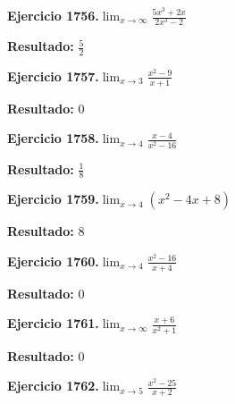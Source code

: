 \documentclass[10pt,a4paper]{article}
\begin{document}
\newpage
\begin{ejbox}
\textbf{Ejercicio 1756.}\quad $\lim_{x\to \infty} \frac{5x^3 + 2x}{2x^3 - 2}$
\end{ejbox}

\begin{solbox}
\textbf{Resultado:} \(\displaystyle \frac{5}{2}\)
\end{solbox}

\begin{ejbox}
\textbf{Ejercicio 1757.}\quad $\lim_{x\to 3} \frac{x^2-9}{x+1}$
\end{ejbox}

\begin{solbox}
\textbf{Resultado:} \(\displaystyle 0\)
\end{solbox}

\begin{ejbox}
\textbf{Ejercicio 1758.}\quad $\lim_{x\to 4} \frac{x-4}{x^2-16}$
\end{ejbox}

\begin{solbox}
\textbf{Resultado:} \(\displaystyle \frac{1}{8}\)
\end{solbox}

\newpage
\begin{ejbox}
\textbf{Ejercicio 1759.}\quad $\lim_{x\to 4} (x^2 -4x +8)$
\end{ejbox}

\begin{solbox}
\textbf{Resultado:} \(\displaystyle 8\)
\end{solbox}

\begin{ejbox}
\textbf{Ejercicio 1760.}\quad $\lim_{x\to 4} \frac{x^2-16}{x+4}$
\end{ejbox}

\begin{solbox}
\textbf{Resultado:} \(\displaystyle 0\)
\end{solbox}

\begin{ejbox}
\textbf{Ejercicio 1761.}\quad $\lim_{x\to \infty} \frac{x + 6}{x^2 + 1}$
\end{ejbox}

\begin{solbox}
\textbf{Resultado:} \(\displaystyle 0\)
\end{solbox}

\newpage
\begin{ejbox}
\textbf{Ejercicio 1762.}\quad $\lim_{x\to 5} \frac{x^2-25}{x+2}$
\end{ejbox}
\end{document}
